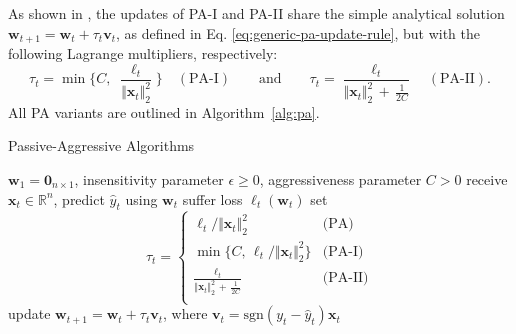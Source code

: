 As shown in \citep{crammer06}, the updates of PA-I and PA-II share the simple analytical solution $\mathbf{w}_{t+1} = \mathbf{w}_t + \tau_t \mathbf{v}_t$, as defined in Eq. \eqref{eq:generic-pa-update-rule}, but with the following Lagrange multipliers, respectively:
\begin{equation}
	\tau_t = \min\bigg\{C, \; \frac{\ell_t}{\Vert\mathbf{x}_t\Vert_2^2}\bigg\} \quad (\text{PA-I})
	\qquad \text{and} \qquad
	\tau_t = \frac{\ell_t}{\Vert\mathbf{x}_t\Vert_2^2 \, + \, \frac{1}{2C}} \quad (\text{PA-II}).
\end{equation}
All PA variants are outlined in Algorithm~\ref{alg:pa}.
\begin{algorithm}[H]
  \caption{Passive-Aggressive Algorithms}
\label{alg:pa}
  \begin{algorithmic}[1]
     $\mathbf{w}_1 = \mathbf{0}_{n\times 1}$, insensitivity parameter $\epsilon \geq 0$, aggressiveness parameter $C > 0$
      \STATE receive $\mathbf{x}_t \in \mathbb{R}^n$, predict $\hat{y}_t$ using $\mathbf{w}_t$
      \STATE suffer loss $\ell_t(\mathbf{w}_t)$
      \STATE set
      \begin{equation*}
      	\tau_t = 
      	\begin{cases}
      		\ell_t / \Vert\mathbf{x}_t\Vert_2^2 & \text{(PA)} \\
      		\min\{C,\, \ell_t / \Vert\mathbf{x}_t\Vert_2^2\}  & \text{(PA-I)} \\
      		\frac{\ell_t}{\Vert\mathbf{x}_t\Vert_2^2 \, + \, \frac{1}{2C}} & \text{(PA-II)} \\
      	\end{cases}
      \end{equation*}
    \STATE update $\mathbf{w}_{t+1} = \mathbf{w}_t + \tau_t \mathbf{v}_t$, where $\mathbf{v}_t = \mathrm{sgn}(y_t - \hat{y}_t)\mathbf{x}_t$
    \ENDFOR
  \end{algorithmic}
\end{algorithm}
%

